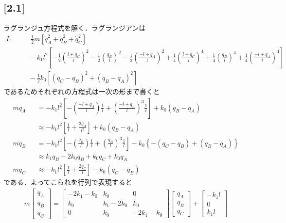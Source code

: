 \documentclass[12pt,dvipdfmx]{jsarticle}
\begin{document}
\subsection*{\large{[2.1]}}
ラグランジュ方程式を解く．ラグランジアンは
\begin{eqnarray*}
  L &&= \frac{1}{2}m\left[ \dot{q}_A^2+\dot{q}_B^2+\dot{q}_C^2 \right] \\
  &&\quad -k_1l^2 \left[ -\frac{1}{2}\left( \frac{l+q_C}{l} \right)^2 - \frac{1}{2}\left( \frac{q_B}{l} \right)^2- \frac{1}{2}\left( \frac{-l+q_A}{l} \right)^2 + \frac{1}{4}\left( \frac{l+q_C}{l} \right)^4+ \frac{1}{4}\left( \frac{q_B}{l} \right)^4 + \frac{1}{4}\left( \frac{-l+q_A}{l} \right)^4 \right]\\
  &&\quad -\frac{1}{2}k_0\left[ (q_C-q_B)^2 + (q_B-q_A)^2 \right]
\end{eqnarray*}
であるためそれぞれの方程式は一次の形まで書くと
\begin{eqnarray*}
  m\ddot{q}_A &&= -k_1l^2 \left[ -\left( \frac{-l+q_A}{l} \right)\frac{1}{l}+ \left( \frac{-l+q_A}{l} \right)^3 \frac{1}{l} \right]+k_0(q_B-q_A)\\
  &&\approx -k_1l^2 \left[ \frac{1}{l}+ \frac{2q_A}{l^2} \right] + k_0\left( q_B-q_A \right)\\
  m\ddot{q}_B &&= -k_1l^2 \left[ -\left( \frac{q_B}{l} \right)\frac{1}{l}+ \left( \frac{q_B}{l} \right)^3 \frac{1}{l}\right]-k_0\left\{ -(q_C-q_B) + (q_B-q_A) \right\}\\
  &&\approx k_1 q_B -2k_0 q_B + k_0 q_C + k_0q_A\\
  m\ddot{q}_C &&\approx -k_1l^2 \left[ \frac{1}{l}+ \frac{2q_C}{l} \right] - k_0(q_C-q_B)
\end{eqnarray*}
である．よってこられを行列で表現すると
\begin{eqnarray}
  m
  \begin{bmatrix}
   \ddot{q}_A\\
   \ddot{q}_B\\ 
   \ddot{q}_C
  \end{bmatrix}
  =
  \begin{bmatrix}
    -2k_1-k_0 & k_0 & 0\\
    k_0 & k_1-2k_0 & k_0\\
    0 & k_0 & -2k_1-k_0
  \end{bmatrix}
  \begin{bmatrix}
    q_A\\
    q_B\\
    q_C
  \end{bmatrix}
  + 
  \begin{bmatrix}
    -k_1l\\
    0\\
    k_1l
  \end{bmatrix}
\end{eqnarray}
\end{document}
